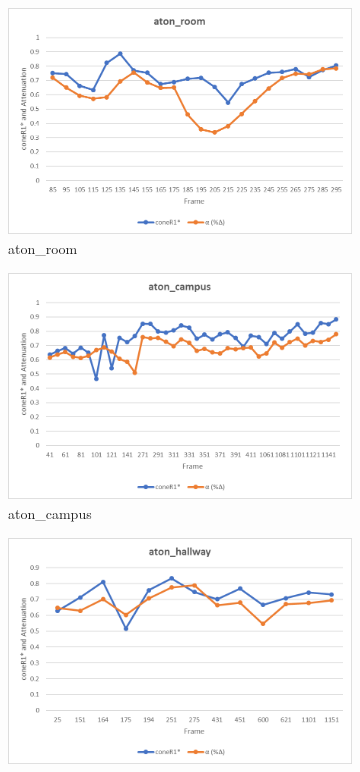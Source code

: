 \begin{appendices}
\begin{figure}
  \begin{subfigure}{.45\linewidth}
  \includegraphics[width=1\linewidth]{figures/appendix/room_rgb.jpg}
  \caption{aton\_room}
\end{subfigure}
\hfill
\begin{subfigure}{.45\linewidth}
  \includegraphics[width=1\linewidth]{figures/appendix/campus_rgb.jpg}
  \caption{aton\_campus}
\end{subfigure}
\hfill
\begin{subfigure}{.45\linewidth}
  \includegraphics[width=1\linewidth]{figures/appendix/hallway_rgb.jpg}

\end{subfigure}
\end{figure}
\end{appendices}
